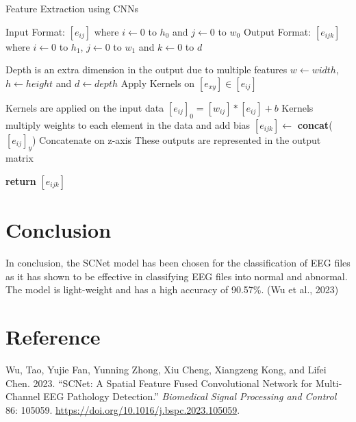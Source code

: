 \documentclass[11pt]{article}
\newlength{\cslhangindent}
\newlength{\cslentryspacingunit} %
\newenvironment{CSLReferences}[2] %
 {%
  \setlength{\parindent}{0pt}
  \ifodd #1
  \let\oldpar\par
  \def\par{\hangindent=\cslhangindent\oldpar}
  \fi
  \setlength{\parskip}{#2\cslentryspacingunit}
 }%
 {}
\begin{document}
\begin{algorithm}
    \caption{Feature Extraction using CNNs}
    \begin{algorithmic}[1]
        \State Input Format: $[e_{ij}]$ where $i \gets 0$ to $h_0$ and $j \gets 0$ to $w_0$
        \State Output Format: $[e_{ijk}]$ where $i \gets 0$ to $h_1$, $j \gets 0$ to $w_1$ and $k \gets 0$ to $d$

        \Comment Depth is an extra dimension in the output due to multiple features
        \State $w \gets width$, $h \gets height$ and $d \gets depth$
        \State Apply Kernels on $[e_{xy}] \in [e_{ij}]$ 

        \State \Comment Kernels are applied on the input data
        \State $[e_{ij}]_0 = [w_{ij}] * [e_{ij}] + b$
        \State \Comment Kernels multiply weights to each element in the data and add bias
        \State $[e_{ijk}] \gets$ \textbf{concat}($[e_{ij}]_y$) \Comment Concatenate on z-axis
        \State \Comment These outputs are represented in the output matrix

        \State \textbf{return} $[e_{ijk}]$


        \EndProcedure
        
    \end{algorithmic}
\end{algorithm}

\newpage
\section{Conclusion}
In conclusion, the SCNet model has been chosen for the classification of EEG files as it has shown to be effective in classifying EEG files into normal and abnormal. The model is light-weight and has a high accuracy of 90.57\%. (Wu et al., 2023)

\section{Reference}
\hypertarget{refs}{}
\begin{CSLReferences}{1}{0}
\leavevmode{}%
Wu, Tao, Yujie Fan, Yunning Zhong, Xiu Cheng, Xiangzeng Kong, and Lifei
Chen. 2023. {``SCNet: A Spatial Feature Fused Convolutional Network for
Multi-Channel EEG Pathology Detection.''} \emph{Biomedical Signal
Processing and Control} 86: 105059.
\url{https://doi.org/10.1016/j.bspc.2023.105059}.

\end{CSLReferences}
\end{document}
